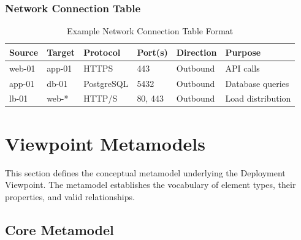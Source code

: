 \documentclass[11pt,letterpaper]{article}
\begin{document}
\subsubsection{Network Connection Table}

\begin{table}[H]
\centering
\caption{Example Network Connection Table Format}
\small
\begin{tabular}{@{}L{2cm}L{2cm}L{2cm}L{2cm}L{2cm}L{2.5cm}@{}}
\toprule
\textbf{Source} & \textbf{Target} & \textbf{Protocol} & \textbf{Port(s)} & \textbf{Direction} & \textbf{Purpose} \\
\midrule
web-01 & app-01 & HTTPS & 443 & Outbound & API calls \\
app-01 & db-01 & PostgreSQL & 5432 & Outbound & Database queries \\
lb-01 & web-* & HTTP/S & 80, 443 & Outbound & Load distribution \\
\bottomrule
\end{tabular}
\end{table}

\section{Viewpoint Metamodels}

This section defines the conceptual metamodel underlying the Deployment Viewpoint. The metamodel establishes the vocabulary of element types, their properties, and valid relationships.

\subsection{Core Metamodel}
\end{document}

